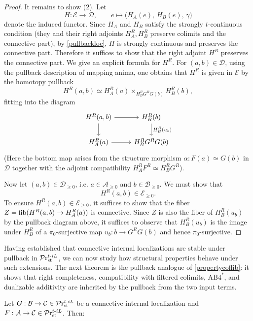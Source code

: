 \documentclass[a4paper,10pt, oneside]{amsart}
\begin{document}
\begin{proof}
		It remains to show (2). Let 
		\[
		H: \mathcal{E} \to \mathcal{D}, \qquad e \mapsto \big(H_A(e),\, H_B(e),\, \gamma\big)
		\] denote the induced functor.
		Since \(H_A\) and \(H_B\) satisfy the strongly $t$-continuous condition (they and their right adjoints \(H_A^R, H_B^R\) preserve colimits and the connective part), by \cref{pullbackloc}, $H$ is strongly continuous  and preserves the connective part.
		Therefore it suffices to show that the right adjoint \(H^R\) preserves the connective part.
		We give an explicit formula for \(H^R\). For \((a,b) \in \mathcal{D}\), using the pullback description of mapping anima, one obtains that \(H^R\) is given in \(\mathcal{E}\) by the homotopy pullback
		\[
		H^R(a,b) \simeq H_A^R(a) \times_{H_B^R G^R G(b)} H_B^R(b),
		\]
		fitting into the diagram
		\[
		\begin{tikzcd}
			H^R(a,b) \arrow[r] \arrow[d] & H_B^R(b) \arrow[d, "H_B^R(u_b)"] \\
			H_A^R(a) \arrow[r] & H_B^R G^R G(b)
		\end{tikzcd}
		\]
		(Here the bottom map arises from the structure morphism \(\alpha:F(a) \simeq G(b)\) in \(\mathcal{D}\) together with the adjoint compatibility \(H_A^R F^R \simeq H_B^R G^R\)).  
		
		Now let \((a,b) \in \mathcal{D}_{\geq 0}\), i.e. \(a \in \mathcal{A}_{\geq 0}\) and \(b \in \mathcal{B}_{\geq 0}\). We must show that
		\[
		H^R(a,b) \in \mathcal{E}_{\geq 0}.
		\]
		To ensure \(H^R(a,b) \in \mathcal{E}_{\geq 0}\), it suffices to show that the fiber $Z=\mathrm{fib}(	H^R(a,b)\to H_A^R(a))$ is connective. Since $Z$ is also the fiber of $H_B^R(u_b)$ by the pullback diagram above, it suffices to observe that $H_B^R(u_b)$ is the image under \(H_B^R\) of a $\pi_0$-surjective map \(u_b: b \to G^R G(b)\) and hence $\pi_0$-surjective.
	\end{proof}
	Having established that connective internal localizations are stable under pullback in $\mathcal{P}\mathrm{r}^{t\text{-}iL}_{\mathrm{st}}$, we can now study how structural properties behave under such extensions. The next theorem is the pullback analogue of \cref{propertycoffib}: it shows that right completeness, compatibility with filtered colimits, $\mathrm{AB4}^*$, and dualizable additivity are inherited by the pullback from the two input terms.
	\begin{thm}\label{propertyext}
			Let $G:\mathcal{B}\to\mathcal{C}\in \mathcal{P}\mathrm{r}^{t\text{-}iL}_{\mathrm{st}}$ be a connective internal localization and $F:\mathcal{A} \to\mathcal{C} \in\mathcal{P}\mathrm{r}^{t\text{-}iL}_{\mathrm{st}}$. Then:
	\end{thm}
\end{document}
